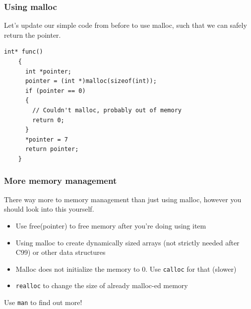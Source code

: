 \documentclass{beamer}
\begin{document}
\begin{frame}[fragile]
  \frametitle{Using malloc}
  Let's update our simple code from before to use malloc, such that we can safely return the pointer.
  \begin{lstlisting}[style=customc]
    int* func()
    {
      int *pointer;
      pointer = (int *)malloc(sizeof(int));
      if (pointer == 0)
      {
        // Couldn't malloc, probably out of memory
        return 0;
      }
      *pointer = 7
      return pointer;
    }
    \end{lstlisting}
\end{frame}
\begin{frame}
  \frametitle{More memory management}
  There way more to memory management than just using malloc, however you should look into this yourself.
  \begin{itemize}
    \item Use free(pointer) to free memory after you're doing using item
    \item Using malloc to create dynamically sized arrays (not strictly needed after C99) or other data structures
    \item Malloc does not initialize the memory to 0. Use \texttt{calloc} for that (slower)
    \item \texttt{realloc} to change the size of already malloc-ed memory
  \end{itemize}
  Use \texttt{man} to find out more!
\end{frame}
\end{document}
